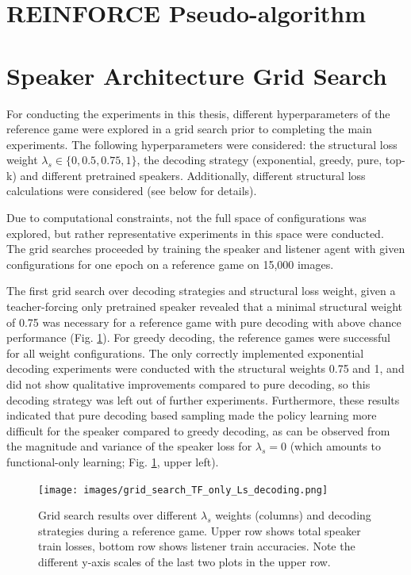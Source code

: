 \section{REINFORCE Pseudo-algorithm}

\section{Speaker Architecture Grid Search}
\label{app:grid_search}

For conducting the experiments in this thesis, different hyperparameters of the reference game were explored in a grid search prior to completing the main experiments. The following hyperparameters were considered: the structural loss weight $\lambda_s \in \{0, 0.5, 0.75, 1\}$, the decoding strategy (exponential, greedy, pure, top-k) and different pretrained speakers. Additionally, different structural loss calculations were considered (see below for details). 

Due to computational constraints, not the full space of configurations was explored, but rather representative experiments in this space were conducted. The grid searches proceeded by training the speaker and listener agent with given configurations for one epoch on a reference game on 15,000 images. 

The first grid search over decoding strategies and structural loss weight, given a teacher-forcing only pretrained speaker revealed that a minimal structural weight of 0.75 was necessary for a reference game with pure decoding with above chance performance (Fig. \ref{fig:coco_grid_Ls_decoding_TF_only}). For greedy decoding, the reference games were successful for all weight configurations. The only correctly implemented exponential decoding experiments were conducted with the structural weights 0.75 and 1, and did not show qualitative improvements compared to pure decoding, so this decoding strategy was left out of further experiments. Furthermore, these results indicated that pure decoding based sampling made the policy learning more difficult for the speaker compared to greedy decoding, as can be observed from the magnitude and variance of the speaker loss for $\lambda_s = 0$ (which amounts to functional-only learning; Fig. \ref{fig:coco_grid_Ls_decoding_TF_only}, upper left).

\begin{figure}[h]
	\centering
	\texttt{[image: images/grid\_search\_TF\_only\_Ls\_decoding.png]}
	\caption{Grid search results over different $\lambda_s$ weights (columns) and decoding strategies during a reference game. Upper row shows total speaker train losses, bottom row shows listener train accuracies. Note the different y-axis scales of the last two plots in the upper row.}
	\label{fig:coco_grid_Ls_decoding_TF_only}
\end{figure}


